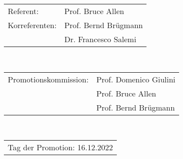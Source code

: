 \thispagestyle{empty}
\vspace*{\fill}
\begin{flushleft}
\begin{tabular}{l l}
	Referent:      & Prof. Bruce Allen\\
	Korreferenten: & Prof. Bernd Brügmann\\
	               & Dr. Francesco Salemi
\end{tabular}\\
\vspace{1cm}
\begin{tabular}{l l}
	Promotionskommission: & Prof. Domenico Giulini\\
	                      & Prof. Bruce Allen\\
	                      & Prof. Bernd Brügmann
\end{tabular}\\
\vspace{1cm}
\begin{tabular}{l}
Tag der Promotion: 16.12.2022
\end{tabular}
\end{flushleft}
\newpage
